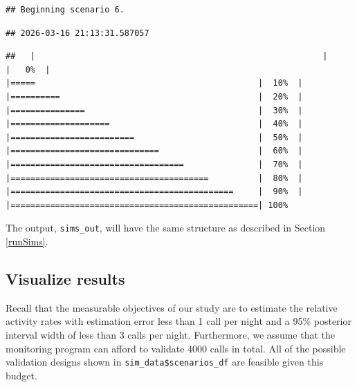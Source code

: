 \documentclass[
]{article}
\begin{document}
\begin{verbatim}
## Beginning scenario 6.
\end{verbatim}

\begin{verbatim}
## 2026-03-16 21:13:31.587057
\end{verbatim}

\begin{verbatim}
##   |                                                          |                                                  |   0%  |                                                          |=====                                             |  10%  |                                                          |==========                                        |  20%  |                                                          |===============                                   |  30%  |                                                          |====================                              |  40%  |                                                          |=========================                         |  50%  |                                                          |==============================                    |  60%  |                                                          |===================================               |  70%  |                                                          |========================================          |  80%  |                                                          |=============================================     |  90%  |                                                          |==================================================| 100%
\end{verbatim}

\linespread{1}

The output, \texttt{sims\_out}, will have the same structure as described in Section \ref{runSims}.

\subsection{\texorpdfstring{Visualize results \label{vizbyspp}}{Visualize results }}\label{visualize-results}

Recall that the measurable objectives of our study are to estimate the relative activity rates with estimation error less than 1 call per night and a 95\% posterior interval width of less than 3 calls per night. Furthermore, we assume that the monitoring program can afford to validate 4000 calls in total. All of the possible validation designs shown in \texttt{sim\_data\$scenarios\_df} are feasible given this budget.
\end{document}
